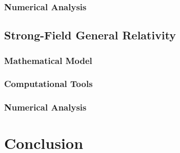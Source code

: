 \documentclass{report}
\begin{document}
        \subsection{Numerical Analysis}

    \section{Strong-Field General Relativity}

        \subsection{Mathematical Model}

        \subsection{Computational Tools}

        \subsection{Numerical Analysis}

\chapter{Conclusion}

\printbibliography

\printindex
\end{document}
